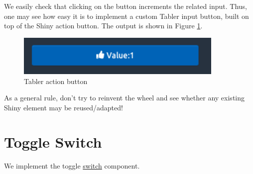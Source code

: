 \documentclass[
]{book}
\newenvironment{Shaded}{\begin{snugshade}}{\end{snugshade}}
\newcommand{\ControlFlowTok}[1]{\textcolor[rgb]{0.13,0.29,0.53}{\textbf{#1}}}
\newcommand{\DataTypeTok}[1]{\textcolor[rgb]{0.13,0.29,0.53}{#1}}
\newcommand{\KeywordTok}[1]{\textcolor[rgb]{0.13,0.29,0.53}{\textbf{#1}}}
\newcommand{\NormalTok}[1]{#1}
\newcommand{\OperatorTok}[1]{\textcolor[rgb]{0.81,0.36,0.00}{\textbf{#1}}}
\newcommand{\StringTok}[1]{\textcolor[rgb]{0.31,0.60,0.02}{#1}}
\begin{document}
\begin{Shaded}
\end{Shaded}

We easily check that clicking on the button increments the related input. Thus, one may see how easy it is to implement a custom Tabler input button, built on top of the Shiny action button. The output is shown in Figure \ref{fig:tabler-button}.

\begin{figure}
\includegraphics[width=3.92in]{images/practice/tabler-button} \caption{Tabler action button}\label{fig:tabler-button}
\end{figure}

As a general rule, don't try to reinvent the wheel and see whether any existing Shiny element may be reused/adapted!

\hypertarget{toggle-switch}{%
\section{Toggle Switch}\label{toggle-switch}}

We implement the toggle \href{https://preview-dev.tabler.io/docs/form-elements.html\#custom-selectboxes}{switch} component.
\end{document}
